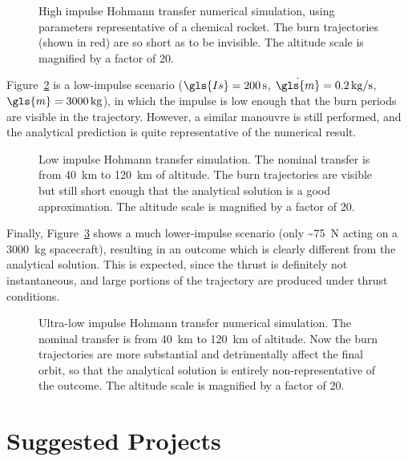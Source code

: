 \documentclass[12pt,openany]{book}
\begin{document}
\begin{figure}[htbp]
  \centering
  \resizebox{0.5\textwidth}{!}{}
  \caption{High impulse Hohmann transfer numerical simulation, using parameters representative of a chemical rocket. The burn trajectories (shown in red) are so short as to be invisible. The altitude scale is magnified by a factor of 20.}
  \label{fig:hohmann-high-impulse}
\end{figure}

Figure~\ref{fig:hohmann-low-impulse} is a low-impulse scenario (\(\gls{Is}=\SI{200}{s}\), \(\dot{\gls{m}}=\SI{0.2}{kg\per\s}\), \(\gls{m}=\SI{3000}{kg}\)), in which the impulse is low enough that the burn periods are visible in the trajectory. However, a similar manouvre is still performed, and the analytical prediction is quite representative of the numerical result.

\begin{figure}[htbp]
  \centering
  \resizebox{0.5\textwidth}{!}{}
  \caption{Low impulse Hohmann transfer simulation. The nominal transfer is from \SI{40}{km} to \SI{120}{km} of altitude. The burn trajectories are visible but still short enough that the analytical solution is a good approximation. The altitude scale is magnified by a factor of 20.}
  \label{fig:hohmann-low-impulse}
\end{figure}

Finally, Figure~\ref{fig:hohmann-ultra-low-impulse} shows a much lower-impulse scenario (only \SI{~75}{N} acting on a \SI{3000}{kg} spacecraft), resulting in an outcome which is clearly different from the analytical solution. This is expected, since the thrust is definitely not instantaneous, and large portions of the trajectory are produced under thrust conditions.

\begin{figure}[htbp]
  \centering
  \resizebox{0.5\textwidth}{!}{}
  \caption{Ultra-low impulse Hohmann transfer numerical simulation. The nominal transfer is from \SI{40}{km} to \SI{120}{km} of altitude. Now the burn trajectories are more substantial and detrimentally affect the final orbit, so that the analytical solution is entirely non-representative of the outcome. The altitude scale is magnified by a factor of 20.}
  \label{fig:hohmann-ultra-low-impulse}
\end{figure}

\chapter{Suggested Projects}
\end{document}

